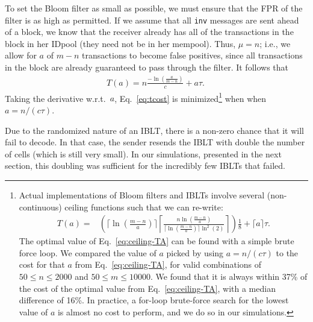To set the Bloom filter as small as possible, we must ensure
that the FPR of the filter is as high as permitted. If we assume 
that all {\tt inv} messages are sent ahead of a block, we know that the receiver already has all
of the transactions in the block in her IDpool (they need not be in her mempool). 
Thus, $\mu=n$; i.e.,  we allow for $a$ of $m-n$ transactions
to become false positives, since all transactions in the block are
already guaranteed to pass through the filter. It follows that
\begin{align}
T(a) = n\frac{-\ln(\frac{a}{m-n})}{c}+ a\tau.~\label{eq:tcost}
\end{align}
Taking the derivative w.r.t.\ $a$, Eq.~\ref{eq:tcost} is
minimized\footnote{Actual implementations of Bloom filters and IBLTs
  involve several (non-continuous) ceiling functions such that we can re-write:
\vspace{-2ex}
\begin{align}
T(a) =& \left(\lceil\ln(\frac{m-n}{a})\rceil\left\lceil  \frac{n\ln(\frac{m-n}{a})}{\lceil\ln(\frac{m-n}{a})\rceil\ln^2(2)} \right\rceil\right)\frac18 + \lceil a\rceil\tau.\label{eq:ceiling-TA}
\end{align}
The optimal value of Eq.~\ref{eq:ceiling-TA} can be found with a simple brute force
loop.  We compared the value of $a$ picked by using 
$a=n/(c\tau)$ to the cost for that $a$ from Eq.~\ref{eq:ceiling-TA}, for valid combinations of $50\leq n \leq 2000$
and $50\leq m \leq 10000$. We found that it is always within 37\% of
the cost of the optimal value from Eq.~\ref{eq:ceiling-TA}, with a median difference of 16\%. In
practice, a for-loop brute-force search for the lowest value of $a$ is
almost no cost to perform, and we do so in our simulations.}
 when when $a=n/(c\tau)$.

Due to the randomized nature of an IBLT,
there is a non-zero chance that it will fail to decode. In that case,
the sender resends the IBLT with double the number of cells (which is
still very small). In our simulations, presented in the next section,
this doubling was sufficient for the incredibly  few IBLTs that 
failed.

